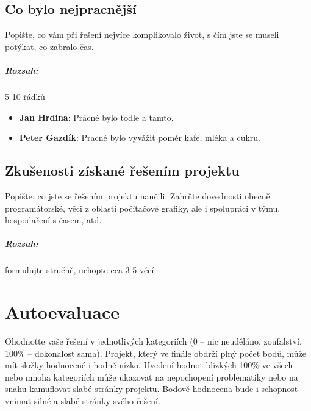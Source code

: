 \documentclass[12pt,a4paper,titlepage,final]{report}
\newcommand\AuthorA{Jan Hrdina}
\newcommand\AuthorB{Peter Gazdík}
\begin{document}
\section{Co bylo nejpracnější}

Popište, co vám při řešení nejvíce komplikovalo život, s čím jste se museli
potýkat, co zabralo čas.

\paragraph{Rozsah:} 5-10 řádků

\begin{itemize}
\item \textbf{\AuthorA}: Prácné bylo todle a tamto.
\item \textbf{\AuthorB}: Pracné bylo vyvážit poměr kafe, mléka a cukru.
\end{itemize}


\section{Zkušenosti získané řešením projektu}

Popište, co jste se řešením projektu naučili. Zahrňte dovednosti obecně
programátorské, věci z oblasti počítačové grafiky, ale i spolupráci v týmu,
hospodaření s časem, atd.

\paragraph{Rozsah:} formulujte stručně, uchopte cca 3-5 věcí

\chapter{Autoevaluace}

Ohodnoťte vaše řešení v jednotlivých kategoriích (0 – nic neuděláno,
zoufalství, 100\% – dokonalost sama). Projekt, který ve finále obdrží plný
počet bodů, může mít složky hodnocené i hodně nízko. Uvedení hodnot blízkých
100\% ve všech nebo mnoha kategoriích může ukazovat na nepochopení problematiky nebo na snahu kamuflovat slabé stránky projektu. Bodově hodnocena bude i
schopnost vnímat silné a slabé stránky svého řešení.
\end{document}
